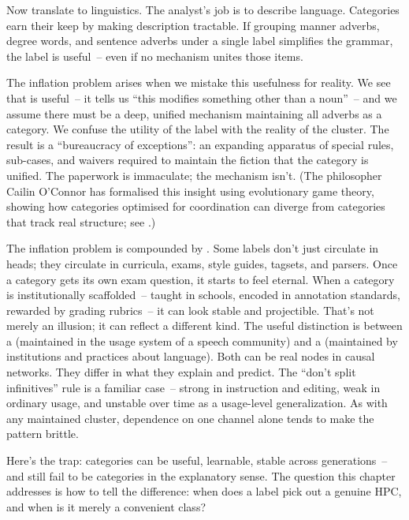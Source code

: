Now translate to linguistics. The analyst's job is to describe language. Categories earn their keep by making description tractable. If grouping manner adverbs, degree words, and sentence adverbs under a single label  simplifies the grammar, the label is useful~-- even if no mechanism unites those items.

The inflation problem arises when we mistake this usefulness for reality. We see that  is useful~-- it tells us \enquote{this modifies something other than a noun}~-- and we assume there must be a deep, unified mechanism maintaining all adverbs as a category. We confuse the utility of the label with the reality of the cluster. The result is a \enquote{bureaucracy of exceptions}: an expanding apparatus of special rules, sub-cases, and waivers required to maintain the fiction that the category is unified. The paperwork is immaculate; the mechanism isn't. (The philosopher Cailin O'Connor has formalised this insight using evolutionary game theory, showing how categories optimised for coordination can diverge from categories that track real structure; see \citealt{oconnor2019games}.)

The inflation problem is compounded by . Some labels don't just circulate in heads; they circulate in curricula, exams, style guides, tagsets, and parsers. Once a category gets its own exam question, it starts to feel eternal. When a category is institutionally scaffolded~-- taught in schools, encoded in annotation standards, rewarded by grading rubrics~-- it can look stable and projectible. That's not merely an illusion; it can reflect a different kind. The useful distinction is between a  (maintained in the usage system of a speech community) and a  (maintained by institutions and practices about language). Both can be real nodes in causal networks. They differ in what they explain and predict. The \enquote{don't split infinitives} rule is a familiar case~-- strong in instruction and editing, weak in ordinary usage, and unstable over time as a usage-level generalization. As with any maintained cluster, dependence on one channel alone tends to make the pattern brittle.

Here's the trap: categories can be useful, learnable, stable across generations~-- and still fail to be categories in the explanatory sense. The question this chapter addresses is how to tell the difference: when does a label pick out a genuine HPC, and when is it merely a convenient class?

